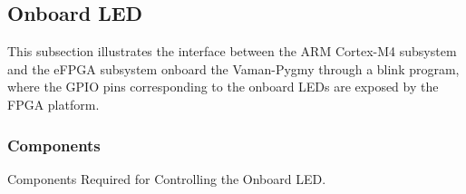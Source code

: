 \subsection{Onboard LED}
This subsection illustrates the interface between the ARM Cortex-M4 subsystem
and the eFPGA subsystem onboard the Vaman-Pygmy through a blink program, where
the GPIO pins corresponding to the onboard LEDs are exposed by the FPGA
platform.

\subsubsection{Components}
\begin{table}[!ht]
    \centering
    
    \caption{Components Required for Controlling the Onboard LED.}
    \label{tab:esp32-m4-fpga-blink-components}
\end{table}

